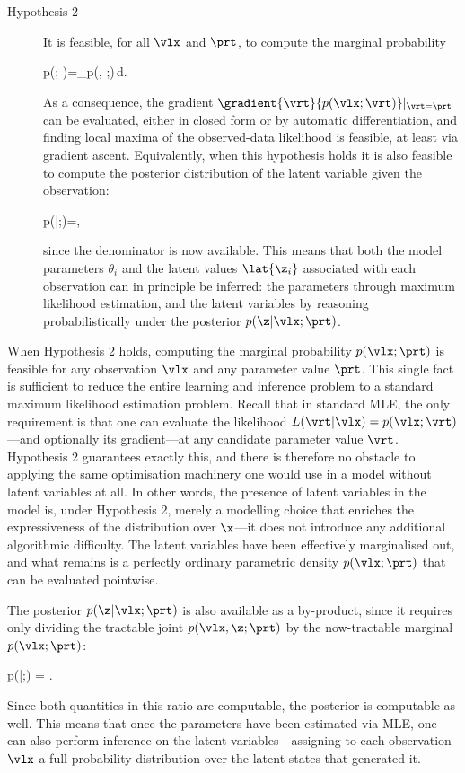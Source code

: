 \begin{description}
\item[Hypothesis 2]
It is feasible, for all $\vlx$ and $\prt$, to compute the marginal probability
\begin{myequation}
p(\vlx; \prt)=\int_{\mZ}p(\vlx, \dz;\prt)\,d\dz.
\end{myequation}
As a consequence, the gradient $\gradient{\vrt}{p(\vlx; \vrt)}|_{\vrt=\prt}$ can be
evaluated, either in closed form or by automatic differentiation, and finding local maxima
of the observed-data likelihood is feasible, at least via gradient ascent. Equivalently,
when this hypothesis holds it is also feasible to compute the posterior distribution of the
latent variable given the observation:
\begin{myequation}
p(\z|\vlx;\prt)=,
\end{myequation}
since the denominator is now available. This means that both the model parameters
$\theta_i$ and the latent values $\lat{\z_i}$ associated with each observation can in
principle be inferred: the parameters through maximum likelihood estimation, and the
latent variables by reasoning probabilistically under the posterior $p(\z|\vlx;\prt)$.
\end{description}

When Hypothesis 2 holds, computing the marginal probability $p(\vlx;\prt)$ is feasible for
any observation $\vlx$ and any parameter value $\prt$. This single fact is sufficient to
reduce the entire learning and inference problem to a standard maximum likelihood
estimation problem. Recall that in standard MLE, the only requirement is that one can
evaluate the likelihood $L(\vrt|\vlx) = p(\vlx;\vrt)$---and optionally its gradient---at any
candidate parameter value $\vrt$. Hypothesis 2 guarantees exactly this, and there is
therefore no obstacle to applying the same optimisation machinery one would use in a
model without latent variables at all. In other words, the presence of latent variables in
the model is, under Hypothesis 2, merely a modelling choice that enriches the
expressiveness of the distribution over $\x$---it does not introduce any additional
algorithmic difficulty. The latent variables have been effectively marginalised out, and what
remains is a perfectly ordinary parametric density $p(\vlx;\prt)$ that can be evaluated
pointwise.

The posterior $p(\z|\vlx;\prt)$ is also available as a by-product, since it requires only
dividing the tractable joint $p(\vlx,\z;\prt)$ by the now-tractable marginal $p(\vlx;\prt)$:
\begin{myequation}
p(\z|\vlx;\prt) = .
\end{myequation}
Since both quantities in this ratio are computable, the posterior is computable as well. This
means that once the parameters have been estimated via MLE, one can also perform
inference on the latent variables---assigning to each observation $\vlx$ a full probability
distribution over the latent states that generated it.

